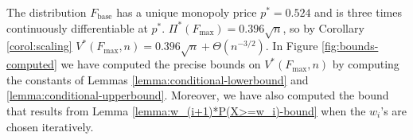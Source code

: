\documentclass[11pt,a4paper]{article}
\numberwithin{equation}{section}
\begin{document}
\noindent The distribution $F_{\text{base}}$ has a unique monopoly price $p^*=0.524$ 
and is three times continuously differentiable at $p^*$.
$\Pi^*(F_{\max})=0.396\sqrt{n}$,
so by Corollary \ref{corol:scaling} $V^*(F_{\max},n)=0.396\sqrt{n}+\Theta(n^{-3/2})$. 
In Figure \ref{fig:bounds-computed} we have computed the precise bounds on $V^*(F_{\max},n)$ by computing the constants of Lemmas \ref{lemma:conditional-lowerbound} and \ref{lemma:conditional-upperbound}.\footnotemark 
{}
Moreover, we have also computed the bound that results from Lemma \ref{lemma:w_(i+1)*P(X>=w_i)-bound} when the $w_i$'s are chosen iteratively.
\end{document}
